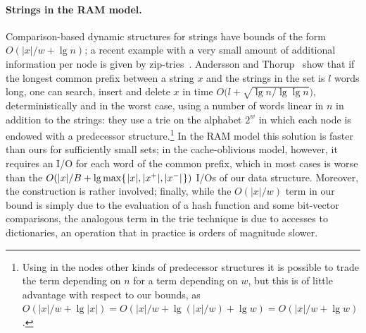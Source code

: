\documentclass[a4paper]{article}
\newcommand{\?}{\mskip1.5mu}
\begin{document}
\paragraph{Strings in the RAM model.} Comparison-based dynamic structures for strings
have bounds of the form $O(|x|/w+\lg n)$; a recent example with a very small amount of additional information per node is given by 
zip-tries~\cite{Eppstein2025Ziptries}. Andersson and Thorup~\cite{AnTDOSEST} show that if the longest common 
prefix between a string $x$ and the strings in the set is $l$ words long, one can search, insert and delete $x$ in time 
$O\bigl(l + \sqrt{\lg n/\lg\lg n}\bigr)$, deterministically and in the worst case, using a number of words linear in $n$ 
in addition to the strings: they use a trie on the alphabet $2^w$ in which each node is endowed with a predecessor structure.\footnote{Using 
in the nodes other kinds of predecessor structures it is possible to trade the term depending on $n$ for a term depending on $w$, but this is of little advantage 
with respect to our bounds, as $O(|x|/w+\lg|x|)=O(|x|/w+\lg(|x|/w)+\lg w)=O(|x|/w+\lg w)$.}
In the RAM model this solution is faster than ours for sufficiently small sets; in the
cache-oblivious model, however, it requires an I/O for each word of the common prefix, which in most cases is worse than the 
$O(|x|/B +\lg\max\{\?|x|,|x^+|,|x^-|\?\})$ I/Os of our data structure. Moreover,
the construction is rather involved; finally, while the $O(|x|/w)$ term in our
bound is simply due to the evaluation of a hash function and some bit-vector
comparisons, the analogous term in the trie technique is due to 
accesses to dictionaries, an operation that in practice is orders of magnitude slower.
\end{document}
